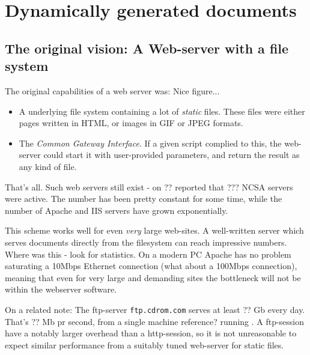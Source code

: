 

\chapter{Dynamically generated documents}
\label{cha:dynamically-generated-documents}


\section{The original vision: A Web-server with a file system }

The original capabilities of a web server was: \textsf{Nice figure...}

\begin{itemize}
\item A underlying file system containing a lot of \textit{static}
files.  These files were either pages written in HTML, or images in
GIF or JPEG formats.

\item The \textit{Common Gateway Interface}.  If a given script
complied to this, the web-server could start it with user-provided
parameters, and return the result as any kind of file.
\end{itemize}

That's all.  Such web servers still exist - on \textsf{??}
 reported that \textsf{???}
NCSA servers were active.  \textsf{The number has been pretty constant
  for some time, while the number of Apache and IIS servers have grown
  exponentially}.

This scheme works well for even \textit{very} large web-sites.  A
well-written server which serves documents directly from the
filesystem can reach impressive numbers.  \textsf{Where was this -
  look for statistics}.  On
a modern PC Apache has no problem saturating a 10Mbps Ethernet
connection (\textsf{what about a 100Mbps connection)}, meaning that
even for very large and demanding sites the bottleneck will not be
within the webserver software.

On a related note: The ftp-server \texttt{ftp.cdrom.com} serves at
least \textsf{??} Gb every day.  That's \textsf{??} Mb pr second, from
a single machine \textsf{reference?} running
.  A ftp-session
have a notably larger overhead than a http-session, so it is not
unreasonable to expect similar performance from a suitably tuned
web-server for static files.


